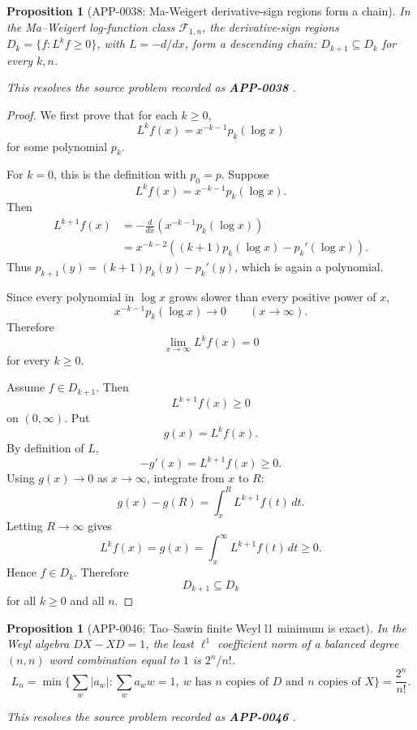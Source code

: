 \documentclass[11pt]{article}
\numberwithin{equation}{section}
\newtheorem{proposition}[theorem]{Proposition}
\theoremstyle{definition}
\theoremstyle{remark}
\newcommand{\1}{\mathbf 1}
\begin{document}
\begin{proposition}[APP-0038: Ma-Weigert derivative-sign regions form a chain]
\label{res:ma-weigert-log-function-dk-chain-conjecture}
In the Ma--Weigert log-function class \(\mathcal F_{1,n}\), the derivative-sign regions \(D_k=\{f:L^k f\ge0\}\), with \(L=-d/dx\), form a descending chain: \(D_{k+1}\subseteq D_k\) for every \(k,n\).

This resolves the source problem recorded as \textbf{APP-0038} \cite{ma-weigert-log-functions}.
\end{proposition}

\begin{proof}
We first prove that for each \(k\ge0\),
\[
L^k f(x)=x^{-k-1}p_k(\log x)
\]
for some polynomial \(p_k\).

For \(k=0\), this is the definition with \(p_0=p\).  Suppose
\[
L^k f(x)=x^{-k-1}p_k(\log x).
\]
Then
\[
\begin{aligned}
L^{k+1}f(x)
&=-\frac{d}{dx}\left(x^{-k-1}p_k(\log x)\right)\\
&=x^{-k-2}\left((k+1)p_k(\log x)-p_k'(\log x)\right).
\end{aligned}
\]
Thus \(p_{k+1}(y)=(k+1)p_k(y)-p_k'(y)\), which is again a polynomial.

Since every polynomial in \(\log x\) grows slower than every positive power of \(x\),
\[
x^{-k-1}p_k(\log x)\to0
\qquad (x\to\infty).
\]
Therefore
\[
\lim_{x\to\infty}L^k f(x)=0
\]
for every \(k\ge0\).

Assume \(f\in D_{k+1}\).  Then
\[
L^{k+1}f(x)\ge0
\]
on \((0,\infty)\).  Put
\[
g(x)=L^k f(x).
\]
By definition of \(L\),
\[
-g'(x)=L^{k+1}f(x)\ge0.
\]
Using \(g(x)\to0\) as \(x\to\infty\), integrate from \(x\) to \(R\):
\[
g(x)-g(R)=\int_x^R L^{k+1}f(t)\,dt.
\]
Letting \(R\to\infty\) gives
\[
L^k f(x)=g(x)=\int_x^\infty L^{k+1}f(t)\,dt\ge0.
\]
Hence \(f\in D_k\).  Therefore
\[
D_{k+1}\subseteq D_k
\]
for all \(k\ge0\) and all \(n\).
\end{proof}

\begin{proposition}[APP-0046: Tao--Sawin finite Weyl l1 minimum is exact]
\label{res:tao-sawin-weyl-l1-exact-minimum}
In the Weyl algebra \(DX-XD=1\), the least \(\ell^1\) coefficient norm of a balanced degree \((n,n)\) word combination equal to \(1\) is \(2^n/n!\).
\[
L_n=\min\{\sum_w |a_w|:\sum_w a_w w=1,\ w\text{ has }n\text{ copies of }D\text{ and }n\text{ copies of }X\}=\frac{2^n}{n!}.
\]

This resolves the source problem recorded as \textbf{APP-0046} \cite{app-app-0046-source}.
\end{proposition}
\end{document}
